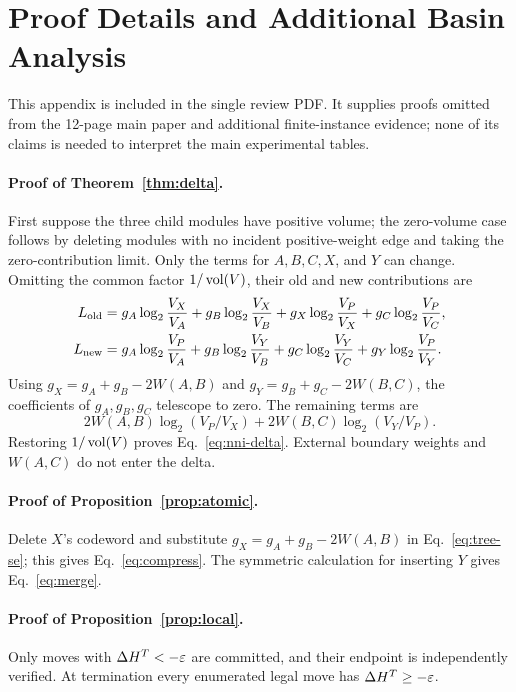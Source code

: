 \section{Proof Details and Additional Basin Analysis}\label{app:proofs}

This appendix is included in the single review PDF. It supplies proofs omitted
from the 12-page main paper and additional finite-instance evidence; none of its
claims is needed to interpret the main experimental tables.

\paragraph{Proof of Theorem~\ref{thm:delta}.}
First suppose the three child modules have positive volume; the zero-volume
case follows by deleting modules with no incident positive-weight edge and
taking the zero-contribution limit. Only the terms for $A,B,C,X$, and $Y$ can
change. Omitting the common factor $1/\operatorname{vol}(V)$, their old and new contributions
are
\begin{align*}
 L_{\rm old}={}&g_A\log_2\frac{V_X}{V_A}
 +g_B\log_2\frac{V_X}{V_B}
 +g_X\log_2\frac{V_P}{V_X}
 +g_C\log_2\frac{V_P}{V_C},\\
 L_{\rm new}={}&g_A\log_2\frac{V_P}{V_A}
 +g_B\log_2\frac{V_Y}{V_B}
 +g_C\log_2\frac{V_Y}{V_C}
 +g_Y\log_2\frac{V_P}{V_Y}.
\end{align*}
Using $g_X=g_A+g_B-2W(A,B)$ and
$g_Y=g_B+g_C-2W(B,C)$, the coefficients of $g_A,g_B,g_C$ telescope to zero.
The remaining terms are
\[
 2W(A,B)\log_2(V_P/V_X)+2W(B,C)\log_2(V_Y/V_P).
\]
Restoring $1/\operatorname{vol}(V)$ proves Eq.~\eqref{eq:nni-delta}. External boundary
weights and $W(A,C)$ do not enter the delta.

\paragraph{Proof of Proposition~\ref{prop:atomic}.}
Delete $X$'s codeword and substitute $g_X=g_A+g_B-2W(A,B)$ in
Eq.~\eqref{eq:tree-se}; this gives Eq.~\eqref{eq:compress}. The symmetric
calculation for inserting $Y$ gives Eq.~\eqref{eq:merge}.

\paragraph{Proof of Proposition~\ref{prop:local}.}
Only moves with $\Delta H^{T}<-\varepsilon$ are committed, and their endpoint is
independently verified. At termination every enumerated legal move has
$\Delta H^{T}\ge-\varepsilon$.

